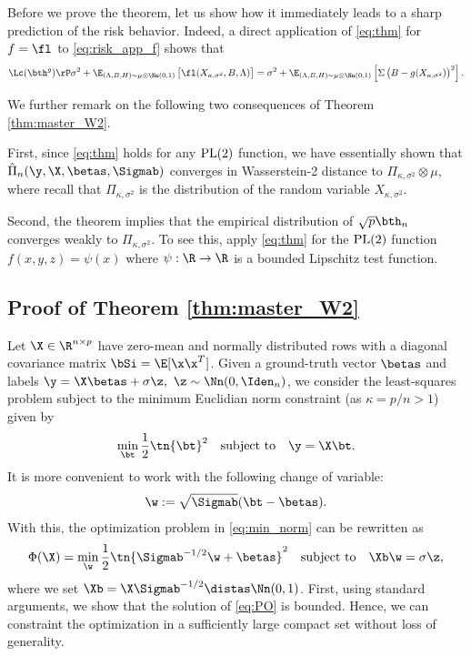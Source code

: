 \mainthm*

Before we prove the theorem, let us show how it immediately leads to a sharp prediction of the risk behavior. Indeed, a direct application of \eqref{eq:thm} for $f=\fl$ to \eqref{eq:risk_app_f} shows that
\begin{align}
\Lc(\bth^g)\rP \sigma^2 +  \E_{(\Lambda,B,H)\sim\mu\otimes\Nn(0,1)}\left[\fl(X_{\kappa,\sigma^2},B,\Lambda) \right] = \sigma^2 +  \E_{(\Lambda,B,H)\sim\mu\otimes\Nn(0,1)}\left[\Sigma\left(B-g(X_{\kappa,\sigma^2})\right)^2 \right].\label{eq:risk_app_f2}
\end{align}

We further remark on the following two consequences of Theorem \ref{thm:master_W2}. 

First, since \eqref{eq:thm} holds for any $\rm{PL}(2)$ function, we have essentially shown that $\hat\Pi_n(\y,\X,\betas,\Sigmab)$ converges in Wasserstein-2 distance to $\Pi_{\kappa,\sigma^2}\otimes\mu$, where recall that $\Pi_{\kappa,\sigma^2}$ is the distribution of the random variable $X_{\kappa,\sigma^2}$.

Second, the theorem implies that the empirical distribution of $\sqrt{p}\bth_n$ converges weakly to $\Pi_{\kappa,\sigma^2}$. To see this, apply \eqref{eq:thm} for the $\rm{PL}(2)$ function $f(x,y,z) = \psi(x)$ where  $\psi:\R\rightarrow\R$ is a bounded Lipschitz test function. 

\subsection{Proof of Theorem \ref{thm:master_W2}}
\vspace{5pt}
Let $\X\in\R^{n\times p}$ have zero-mean and normally distributed rows with a diagonal covariance matrix $\bSi=\E[\x\x^T]$. Given a ground-truth vector $\betas$ and labels $\y=\X\betas+\sigma \z,~\z\sim\Nn(0,\Iden_n)$, we consider the least-squares problem subject to the minimum Euclidian norm constraint (as $\kappa=p/n>1$) given by
\begin{align}\label{eq:PO_beta}
\min_{\bt}\frac{1}{2}\tn{\bt}^2\quad\text{subject to}\quad \y=\X\bt.
\end{align}
It is more convenient to work with the following change of variable: 
\begin{align}\label{eq:w}
\w:=\sqrt{\Sigmab}(\bt-\betas).
\end{align}
 With this, the optimization problem  in \eqref{eq:min_norm} can be rewritten as
\begin{align}\label{eq:PO}
\Phi(\X)=\min_{\w} \frac{1}{2}\tn{\Sigmab^{-1/2}\w+\betas}^2\quad\text{subject to}\quad \Xb\w=\sigma \z,
\end{align}
where we set $\Xb=\X\Sigmab^{-1/2}\distas\Nn(0,1)$. First, using standard arguments, we show that the solution of \eqref{eq:PO} is bounded. Hence, we can constraint the optimization in a sufficiently large compact set without loss of generality.


